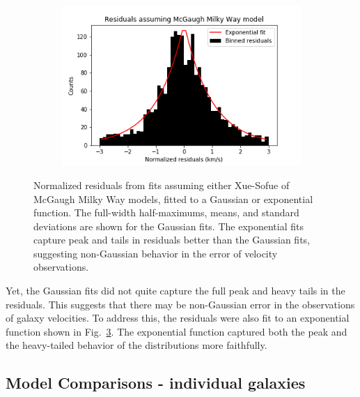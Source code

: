 \documentclass[reprint,%
 amsmath,amssymb,
 aps,
]{revtex4-1}
\begin{document}
\begin{figure}[h]
\begin{subfigure}[b]{0.475\textwidth}
         \label{fig:XueSofue residuals exponential fit}
     \end{subfigure}
     \begin{subfigure}[b]{0.475\textwidth}
         \centering
         \includegraphics[width=.8\linewidth]{figures/ResidualHist_ExpFit_v1_sinh_v2_cosh_sparc128_newnorm_McGaugh}
         \label{fig:McGaugh residuals exponential fit}
     \end{subfigure}
        \caption{Normalized residuals from fits assuming either Xue-Sofue of McGaugh Milky Way models, fitted to a Gaussian or exponential function. The full-width half-maximums, means, and standard deviations are shown for the Gaussian fits. The exponential fits capture peak and tails in residuals better than the Gaussian fits, suggesting non-Gaussian behavior in the error of velocity observations.}
        \label{fig:residual graphs}
\end{figure}
Yet, the Gaussian fits did not quite capture the full peak and heavy tails in the residuals. This suggests that there may be non-Gaussian error in the observations of galaxy velocities. To address this, the residuals were also fit to an exponential function shown in Fig.~\ref{fig:residual graphs}. The exponential function captured both the peak and the heavy-tailed behavior of the distributions more faithfully.



 \subsection{ Model Comparisons - individual galaxies}
 \label{results:MtoL}
 
\end{document}
